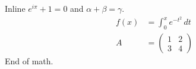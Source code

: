 \documentclass[11pt]{article}
\begin{document}
Inline $e^{i\pi}+1=0$ and $\alpha+\beta=\gamma$. \begin{align}f(x)&=\int_0^x e^{-t^2}\,dt\\A&=\begin{pmatrix}1&2\\3&4\end{pmatrix}\end{align} End of math.
\end{document}
